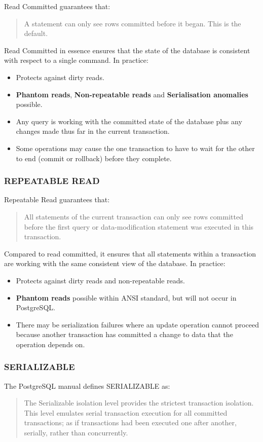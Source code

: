 Read Committed guarantees that:
\begin{quotation}
  A statement can only see rows committed before it began. This is the default.
\end{quotation}
Read Committed in essence ensures that the state of the database is consistent with respect to a single command. 
In practice:
\begin{itemize}
\item Protects against dirty reads.
\item \textbf{Phantom reads}, \textbf{Non-repeatable reads} and \textbf{Serialisation anomalies}  possible.
\item Any query is working with the committed state of the database plus any changes made thus far in the current transaction.
\item Some operations may cause the one transaction to have to wait for the other to end (commit or rollback) before they complete.
\end{itemize}

\subsubsection{REPEATABLE READ}

Repeatable Read guarantees that:
\begin{quotation}
  All statements of the current transaction can only see rows committed before the first query or data-modification statement was executed in this transaction.
\end{quotation}
Compared to read committed, it ensures that all statements within a transaction are working with the same consistent view of the database.
In practice:
\begin{itemize}
\item Protects against dirty reads and non-repeatable reads.
\item \textbf{Phantom reads} possible within ANSI standard, but will not occur in PostgreSQL.
\item There may be serialization failures where an update operation cannot proceed because another transaction has committed a change to data that the operation depends on.
\end{itemize}

\subsubsection{SERIALIZABLE}

The PostgreSQL manual defines SERIALIZABLE as:
\begin{quotation}
  The Serializable isolation level provides the strictest transaction isolation. This level emulates serial transaction execution for all committed transactions; as if transactions had been executed one after another, serially, rather than concurrently.
\end{quotation}



